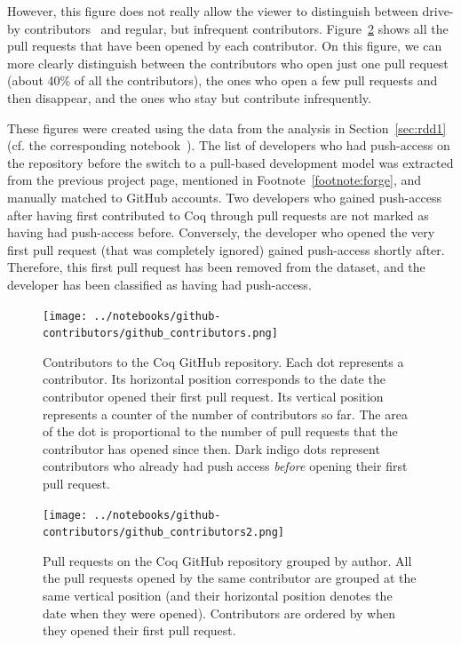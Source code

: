 However, this figure does not really allow the viewer to distinguish between drive-by contributors~\cite{pham2013building} and regular, but infrequent contributors. Figure~\ref{fig:github_contributors2} shows all the pull requests that have been opened by each contributor.
On this figure, we can more clearly distinguish between the contributors who open just one pull request (about 40\% of all the contributors), the ones who open a few pull requests and then disappear, and the ones who stay but contribute infrequently.

These figures were created using the data from the analysis in Section~\ref{sec:rdd1} (cf. the corresponding notebook~\cite{zimmermann2019contributors}).
The list of developers who had push-access on the repository before the switch to a pull-based development model was extracted from the previous project page, mentioned in Footnote~\ref{footnote:forge}, and manually matched to GitHub accounts.
Two developers who gained push-access after having first contributed to Coq through pull requests are not marked as having had push-access before.
Conversely, the developer who opened the very first pull request (that was completely ignored) gained push-access shortly after. Therefore, this first pull request has been removed from the dataset, and the developer has been classified as having had push-access.

\begin{figure}
	\begin{center}
		\texttt{[image: ../notebooks/github-contributors/github\_contributors.png]}
		\caption{
			Contributors to the Coq GitHub repository.
			Each dot represents a contributor.
			Its horizontal position corresponds to the date the contributor opened their first pull request.
			Its vertical position represents a counter of the number of contributors so far.
			The area of the dot is proportional to the number of pull requests that the contributor has opened since then.
			Dark indigo dots represent contributors who already had push access \emph{before} opening their first pull request.
		}
		\label{fig:github_contributors}
	\end{center}
\end{figure}

\begin{figure}
	\begin{center}
		\texttt{[image: ../notebooks/github-contributors/github\_contributors2.png]}
		\caption{
			Pull requests on the Coq GitHub repository grouped by author.
			All the pull requests opened by the same contributor are grouped at the same vertical position (and their horizontal position denotes the date when they were opened).
			Contributors are ordered by when they opened their first pull request.
		}
		\label{fig:github_contributors2}
	\end{center}
\end{figure}

